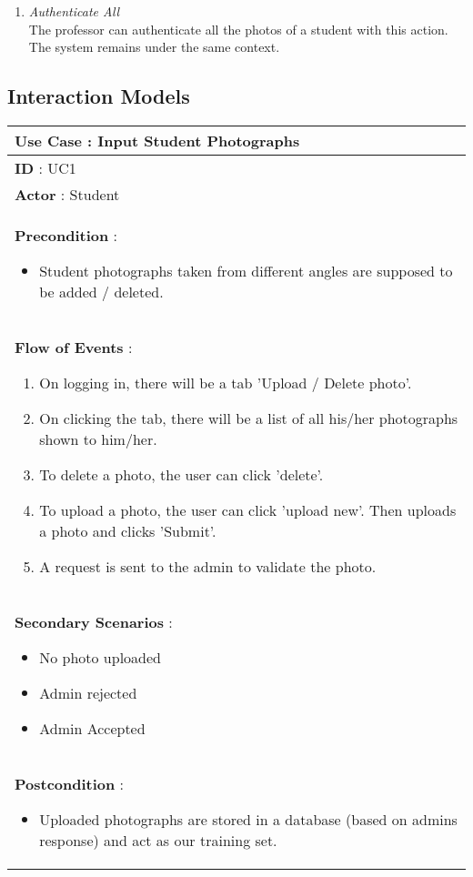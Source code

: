 \documentclass[paper=a4, fontsize=15pt]{scrartcl}
\begin{document}
\begin{itemize}
\begin{enumerate}
        \item \textit{Authenticate All}\\
        The professor can authenticate all the photos of a student with this action. The system remains under the same context.
        
    \end{enumerate}
        

    
    
    

\end{itemize}

\subsection{Interaction Models}


\begin{tabular}{|p{36em}|} 
 \hline
 \textbf{Use Case : Input Student Photographs}\\
 \hline
 \textbf{ID } : UC1\\
 \hline
 \textbf{Actor }: Student\\
 \hline
 \textbf{Precondition }:
 \begin{itemize}[topsep=0pt]
     \item Student photographs taken from different angles are supposed to be added / deleted.
 \end{itemize}\\
 \hline
 \textbf{Flow of Events }:
 \begin{enumerate}[topsep=0pt]
     \item On logging in, there will be a tab 'Upload / Delete photo'.
     \item On clicking the tab, there will be a list of all his/her photographs shown to him/her.
     \item To delete a photo, the user can click 'delete'.
     \item To upload a photo, the user can click 'upload new'. Then uploads a photo and clicks 'Submit'.
     \item A request is sent to the admin to validate the photo.
 \end{enumerate}\\
 \hline
 \textbf{Secondary Scenarios }:
 \begin{itemize}[topsep=0pt]
     \item No photo uploaded
     \item Admin rejected
     \item Admin Accepted
 \end{itemize}\\
 \hline 
 \textbf{Postcondition }:
 \begin{itemize}[topsep=0pt]
     \item Uploaded photographs are stored in a database (based on admins response) and act as our training set.
 \end{itemize}\\
 \hline
 
 
 \end{tabular}
 
\end{document}
